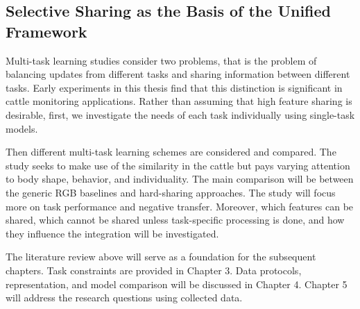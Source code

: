 \subsection{Selective Sharing as the Basis of the Unified Framework}

Multi-task learning studies consider two problems, that is the problem of balancing updates from different tasks and sharing information between different tasks. Early experiments in this thesis find that this distinction is significant in cattle monitoring applications. Rather than assuming that high feature sharing is desirable, first, we investigate the needs of each task individually using single-task models.

Then different multi-task learning schemes are considered and compared. The study seeks to make use of the similarity in the cattle but pays varying attention to body shape, behavior, and individuality. The main comparison will be between the generic RGB baselines and hard-sharing approaches. The study will focus more on task performance and negative transfer. Moreover, which features can be shared, which cannot be shared unless task-specific processing is done, and how they influence the integration will be investigated.

The literature review above will serve as a foundation for the subsequent chapters. Task constraints are provided in Chapter 3. Data protocols, representation, and model comparison will be discussed in Chapter 4. Chapter 5 will address the research questions using collected data.
